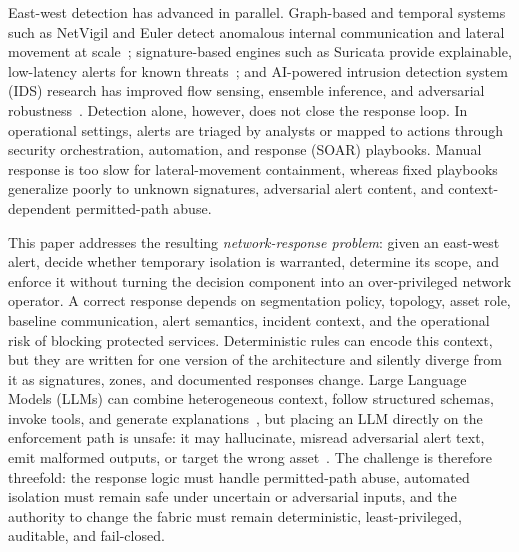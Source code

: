 \documentclass[final,5p]{elsarticle}
\begin{document}
East-west detection has advanced in parallel. Graph-based and temporal systems such as NetVigil and Euler detect anomalous internal communication and lateral movement at scale~\cite{netvigil,king2022euler}; signature-based engines such as Suricata provide explainable, low-latency alerts for known threats~\cite{oisf2026suricata}; and AI-powered intrusion detection system (IDS) research has improved flow sensing, ensemble inference, and adversarial robustness~\cite{jAPELID24,jAA-IDS25}. Detection alone, however, does not close the response loop. In operational settings, alerts are triaged by analysts or mapped to actions through security orchestration, automation, and response (SOAR) playbooks. Manual response is too slow for lateral-movement containment, whereas fixed playbooks generalize poorly to unknown signatures, adversarial alert content, and context-dependent permitted-path abuse.

This paper addresses the resulting \emph{network-response problem}: given an east-west alert, decide whether temporary isolation is warranted, determine its scope, and enforce it without turning the decision component into an over-privileged network operator. A correct response depends on segmentation policy, topology, asset role, baseline communication, alert semantics, incident context, and the operational risk of blocking protected services. Deterministic rules can encode this context, but they are written for one version of the architecture and silently diverge from it as signatures, zones, and documented responses change. Large Language Models (LLMs) can combine heterogeneous context, follow structured schemas, invoke tools, and generate explanations~\cite{wei2022chain,yao2023react,lewis2020rag,schick2023toolformer,wang2023selfconsistency,madaan2023selfrefine}, but placing an LLM directly on the enforcement path is unsafe: it may hallucinate, misread adversarial alert text, emit malformed outputs, or target the wrong asset~\cite{liu2023trustworthyllm,yue2023raghallucination,liu2024promptinjection}. The challenge is therefore threefold: the response logic must handle permitted-path abuse, automated isolation must remain safe under uncertain or adversarial inputs, and the authority to change the fabric must remain deterministic, least-privileged, auditable, and fail-closed.
\end{document}
